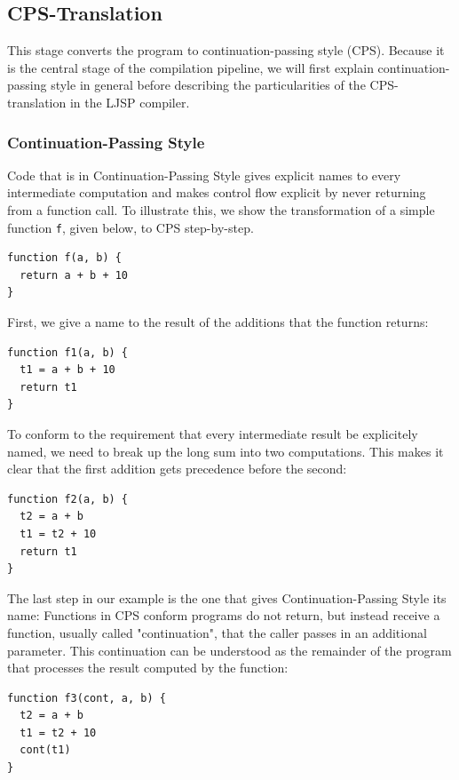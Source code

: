 \documentclass[11pt]{report}
\begin{document}
\subsection{CPS-Translation}
This stage converts the program to continuation-passing style (CPS). Because it is the central stage of the compilation pipeline, we will first explain continuation-passing style in general before describing the particularities of the CPS-translation in the LJSP compiler.

\subsubsection{Continuation-Passing Style}
Code that is in Continuation-Passing Style gives explicit names to every intermediate computation and makes control flow explicit by never returning from a function call.\cite{sysftal}\cite{appel} To illustrate this, we show the transformation of a simple function \texttt{f}, given below, to CPS step-by-step.

\begin{lstlisting}
function f(a, b) {
  return a + b + 10
}
\end{lstlisting}

First, we give a name to the result of the additions that the function returns:

\begin{lstlisting}
function f1(a, b) {
  t1 = a + b + 10
  return t1
}
\end{lstlisting}

To conform to the requirement that every intermediate result be explicitely named, we need to break up the long sum into two computations. This makes it clear that the first addition gets precedence before the second:

\begin{lstlisting}
function f2(a, b) {
  t2 = a + b
  t1 = t2 + 10
  return t1
}
\end{lstlisting}

The last step in our example is the one that gives Continuation-Passing Style its name: Functions in CPS conform programs do not return, but instead receive a function, usually called "continuation", that the caller passes in an additional parameter. This continuation can be understood as the remainder of the program that processes the result computed by the function:

\begin{lstlisting}
function f3(cont, a, b) {
  t2 = a + b
  t1 = t2 + 10
  cont(t1)
}
\end{lstlisting}
\end{document}

